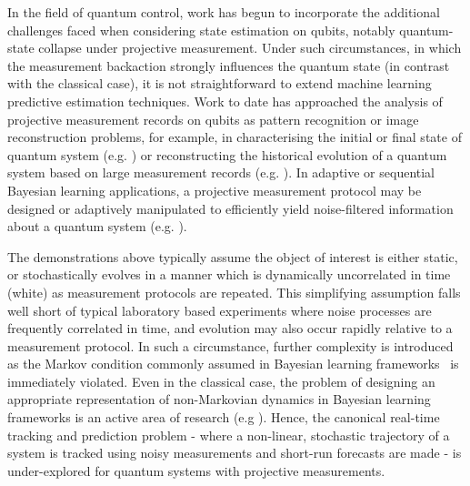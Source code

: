 In the field of quantum control, work has begun to incorporate the additional challenges faced when considering state estimation on qubits, notably quantum-state collapse under projective measurement.  Under such circumstances, in which the measurement backaction strongly influences the quantum state (in contrast with the classical case), it is not straightforward to extend machine learning predictive estimation techniques.  Work to date has approached the analysis of projective measurement records on qubits as pattern recognition or image reconstruction problems, for example, in characterising the initial or final state of quantum system (e.g. \cite{struchalin2016experimental, sergeevich2011characterization, mahler2013adaptive}) or reconstructing the historical evolution of a quantum system based on large measurement records (e.g. \cite{stenberg2016characterization, shabani2011efficient, shen2014reconstructing, de2016estimation, tan2015prediction, huang2017neural}). In adaptive or sequential Bayesian learning applications, a projective measurement protocol may be designed or adaptively manipulated to efficiently yield noise-filtered information about a quantum system (e.g. \cite{bonato2016optimized, wiebe2015bayesian,shulman2014suppressing,granade2016practical}). 

The demonstrations above typically assume the object of interest is either static, or stochastically evolves in a manner which is dynamically uncorrelated in time (white) as measurement protocols are repeated. This simplifying assumption falls well short of typical laboratory based experiments where noise processes are frequently correlated in time, and evolution may also occur rapidly relative to a measurement protocol. In such a circumstance, further complexity is introduced as the Markov condition commonly assumed in Bayesian learning frameworks~\cite{candy2016bayesian} is immediately violated.  Even in the classical case, the problem of designing an appropriate representation of non-Markovian dynamics in Bayesian learning frameworks is an active area of research (e.g  \cite{jacob2017bayesian}).  Hence, the canonical real-time tracking and prediction problem - where a non-linear, stochastic trajectory of a system is tracked using noisy measurements and short-run forecasts are made - is under-explored for quantum systems with projective measurements.

